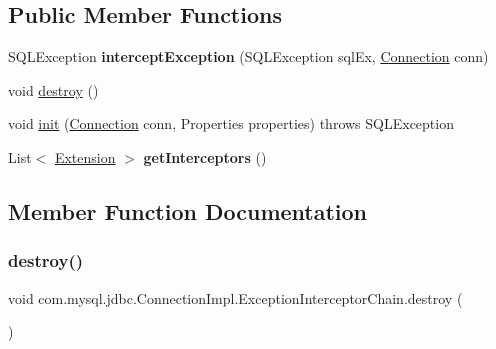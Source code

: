\subsection*{Public Member Functions}
\begin{DoxyCompactItemize}
\item 
\mbox{\label{classcom_1_1mysql_1_1jdbc_1_1_connection_impl_1_1_exception_interceptor_chain_a46b62b1c55416f96eeaa381c33b08d62}} 
S\+Q\+L\+Exception {\bfseries intercept\+Exception} (S\+Q\+L\+Exception sql\+Ex, \mbox{\hyperlink{interfacecom_1_1mysql_1_1jdbc_1_1_connection}{Connection}} conn)
\item 
void \mbox{\hyperlink{classcom_1_1mysql_1_1jdbc_1_1_connection_impl_1_1_exception_interceptor_chain_ae24e090ddfddf714fc561f7b0e8f1ab8}{destroy}} ()
\item 
void \mbox{\hyperlink{classcom_1_1mysql_1_1jdbc_1_1_connection_impl_1_1_exception_interceptor_chain_a0b1980a96fabc8955a709b3b25492dd1}{init}} (\mbox{\hyperlink{interfacecom_1_1mysql_1_1jdbc_1_1_connection}{Connection}} conn, Properties properties)  throws S\+Q\+L\+Exception 
\item 
\mbox{\label{classcom_1_1mysql_1_1jdbc_1_1_connection_impl_1_1_exception_interceptor_chain_a061a745f83206b554f1f133df5246489}} 
List$<$ \mbox{\hyperlink{interfacecom_1_1mysql_1_1jdbc_1_1_extension}{Extension}} $>$ {\bfseries get\+Interceptors} ()
\end{DoxyCompactItemize}


\subsection{Member Function Documentation}
\mbox{\label{classcom_1_1mysql_1_1jdbc_1_1_connection_impl_1_1_exception_interceptor_chain_ae24e090ddfddf714fc561f7b0e8f1ab8}} 
\subsubsection{\texorpdfstring{destroy()}{destroy()}}
{\footnotesize\ttfamily void com.\+mysql.\+jdbc.\+Connection\+Impl.\+Exception\+Interceptor\+Chain.\+destroy (\begin{DoxyParamCaption}{ }\end{DoxyParamCaption})}

